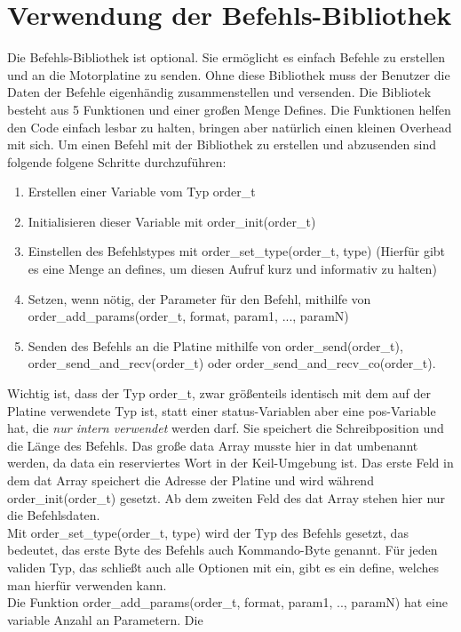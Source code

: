 \documentclass[a4paper]{article}
\begin{document}
	
	\section{Verwendung der Befehls-Bibliothek}
	
	Die Befehls-Bibliothek ist optional. Sie ermöglicht es einfach Befehle zu erstellen und an die
	Motorplatine zu senden. Ohne diese Bibliothek muss der Benutzer die Daten der Befehle eigenhändig
	zusammenstellen und versenden. Die Bibliotek besteht aus 5 Funktionen und einer großen Menge
	Defines. Die Funktionen helfen den Code einfach lesbar zu halten, bringen aber natürlich einen
	kleinen Overhead mit sich.
	Um einen Befehl mit der Bibliothek zu erstellen und abzusenden sind folgende folgene Schritte durchzuführen:
	\begin{enumerate}
		\item Erstellen einer Variable vom Typ order\_t
		\item Initialisieren dieser Variable mit order\_init(order\_t)
		\item Einstellen des Befehlstypes mit order\_set\_type(order\_t, type) (Hierfür gibt es eine Menge an defines,
			um diesen Aufruf kurz und informativ zu halten)
		\item Setzen, wenn nötig, der Parameter für den Befehl, mithilfe von order\_add\_params(order\_t, format, param1, ..., paramN)
		\item Senden des Befehls an die Platine mithilfe von order\_send(order\_t), order\_send\_and\_recv(order\_t) oder
			order\_send\_and\_recv\_co(order\_t).
	\end{enumerate}
	Wichtig ist, dass der Typ order\_t, zwar größenteils identisch mit dem auf der Platine verwendete
	Typ ist, statt einer status-Variablen aber eine pos-Variable hat, die {\em nur intern verwendet} werden darf.
	Sie speichert die Schreibposition und die Länge des Befehls. Das große data Array musste hier in dat umbenannt
	werden, da data ein reserviertes Wort in der Keil-Umgebung ist. Das erste Feld in dem dat Array speichert die Adresse der
	Platine und wird während order\_init(order\_t) gesetzt. Ab dem zweiten Feld des dat Array stehen hier nur die
	Befehlsdaten.\\
	Mit order\_set\_type(order\_t, type) wird der Typ des Befehls gesetzt, das bedeutet, das erste Byte des Befehls auch
	Kommando-Byte genannt. Für jeden validen Typ, das schließt auch alle Optionen mit ein, gibt es ein define, welches man
	hierfür verwenden kann.\\
	Die Funktion order\_add\_params(order\_t, format, param1, .., paramN) hat eine variable Anzahl an Parametern. Die
\end{document}
